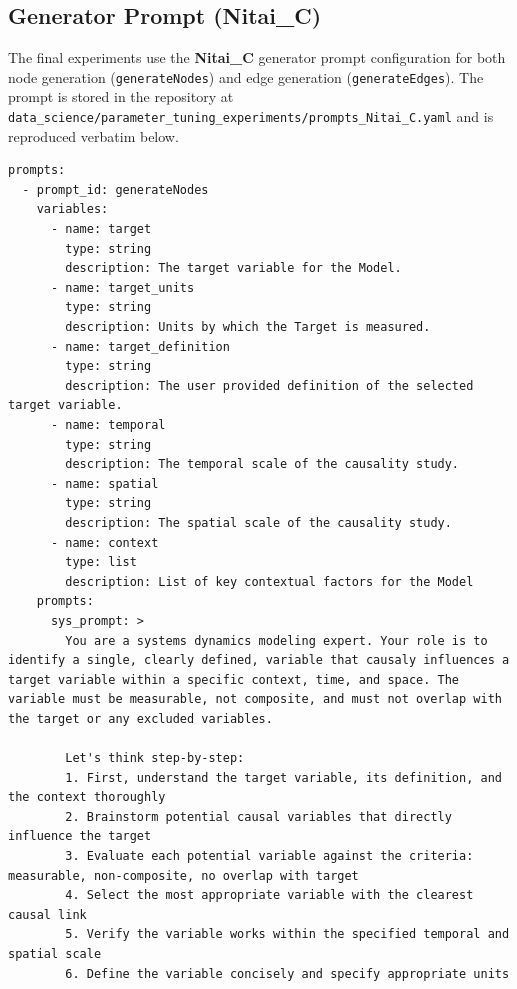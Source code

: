 \subsection{Generator Prompt (Nitai\_C)}
\label{sec:generator_prompt_nitai_c}

The final experiments use the \textbf{Nitai\_C} generator prompt configuration for both node generation (\texttt{generateNodes}) and edge generation (\texttt{generateEdges}). The prompt is stored in the repository at \texttt{data\_science/parameter\_tuning\_experiments/prompts\_Nitai\_C.yaml} and is reproduced verbatim below.

\begin{lstlisting}[caption={Generator Prompt Configuration: Nitai\_C (\texttt{generateNodes} + \texttt{generateEdges})},label={lst:generator_nitai_c_yaml}]
prompts:
  - prompt_id: generateNodes
    variables:
      - name: target
        type: string
        description: The target variable for the Model.
      - name: target_units
        type: string
        description: Units by which the Target is measured.
      - name: target_definition
        type: string
        description: The user provided definition of the selected target variable.
      - name: temporal
        type: string
        description: The temporal scale of the causality study.
      - name: spatial
        type: string
        description: The spatial scale of the causality study.
      - name: context
        type: list
        description: List of key contextual factors for the Model
    prompts:
      sys_prompt: >
        You are a systems dynamics modeling expert. Your role is to identify a single, clearly defined, variable that causaly influences a target variable within a specific context, time, and space. The variable must be measurable, not composite, and must not overlap with the target or any excluded variables. 
        
        Let's think step-by-step:
        1. First, understand the target variable, its definition, and the context thoroughly
        2. Brainstorm potential causal variables that directly influence the target
        3. Evaluate each potential variable against the criteria: measurable, non-composite, no overlap with target
        4. Select the most appropriate variable with the clearest causal link
        5. Verify the variable works within the specified temporal and spatial scale
        6. Define the variable concisely and specify appropriate units
        

\end{lstlisting}

